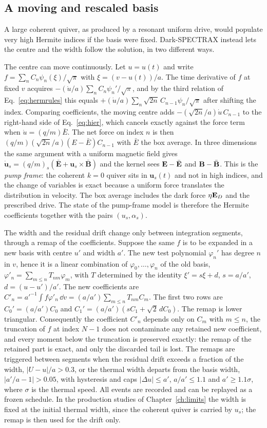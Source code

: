 \subsection{A moving and rescaled basis}\label{sec:pump}

A large coherent quiver, as produced by a resonant uniform drive, would populate very high Hermite indices if the basis were fixed. Dark-SPECTRAX instead lets the centre and the width follow the solution, in two different ways.

The centre can move continuously. Let $u=u(t)$ and write $f=\sum_nC_n\psi_n(\xi)/\sqrt\pi$ with $\xi=(v-u(t))/a$. The time derivative of $f$ at fixed $v$ acquires $-(\dot u/a)\sum_nC_n\psi_n'/\sqrt\pi$, and by the third relation of Eq.~\eqref{eq:hermrules} this equals $+(\dot u/a)\sum_n\sqrt{2n}\,C_{n-1}\psi_n/\sqrt\pi$ after shifting the index. Comparing coefficients, the moving centre adds $-(\sqrt{2n}/a)\dot u\,C_{n-1}$ to the right-hand side of Eq.~\eqref{eq:hier}, which cancels exactly against the force term when $\dot u=(q/m)\bar E$. The net force on index $n$ is then $(q/m)(\sqrt{2n}/a)(E-\bar E)C_{n-1}$ with $\bar E$ the box average. In three dimensions the same argument with a uniform magnetic field gives $\dot{\mathbf u}_s=(q/m)_s(\bar{\mathbf E}+\mathbf u_s\times\bar{\mathbf B})$ and the kernel sees $\mathbf{E}-\bar{\mathbf{E}}$ and $\mathbf{B}-\bar{\mathbf{B}}$. This is the \emph{pump frame}: the coherent $k=0$ quiver sits in $\mathbf u_s(t)$ and not in high indices, and the change of variables is exact because a uniform force translates the distribution in velocity. The box average includes the dark force $\eta\mathbf{E}_D$ and the prescribed drive. The state of the pump-frame model is therefore the Hermite coefficients together with the pairs $(u_s,\alpha_s)$.

The width and the residual drift change only between integration segments, through a remap of the coefficients. Suppose the same $f$ is to be expanded in a new basis with centre $u'$ and width $a'$. The new test polynomial $\varphi_n'$ has degree $n$ in $v$, hence it is a linear combination of $\varphi_0,\dots,\varphi_n$ of the old basis, $\varphi'_n=\sum_{m\le n}T_{nm}\varphi_m$, with $T$ determined by the identity $\xi'=s\xi+d$, $s=a/a'$, $d=(u-u')/a'$. The new coefficients are $C'_n=a'^{-1}\!\int f\varphi'_n\,\dd v=(a/a')\sum_{m\le n}T_{nm}C_m$. The first two rows are $C_0'=(a/a')C_0$ and $C_1'=(a/a')(sC_1+\sqrt2\,dC_0)$. The remap is lower triangular. Consequently the coefficient $C'_n$ depends only on $C_m$ with $m\le n$, the truncation of $f$ at index $N-1$ does not contaminate any retained new coefficient, and every moment below the truncation is preserved exactly: the remap of the retained part is exact, and only the discarded tail is lost. The remaps are triggered between segments when the residual drift exceeds a fraction of the width, $|U-u|/a>0.3$, or the thermal width departs from the basis width, $|a'/a-1|>0.05$, with hysteresis and caps $|\Delta u|\le a'$, $a/a'\le1.1$ and $a'\ge1.1\sigma$, where $\sigma$ is the thermal speed. All events are recorded and can be replayed as a frozen schedule. In the production studies of Chapter~\ref{ch:limits} the width is fixed at the initial thermal width, since the coherent quiver is carried by $u_s$; the remap is then used for the drift only.

